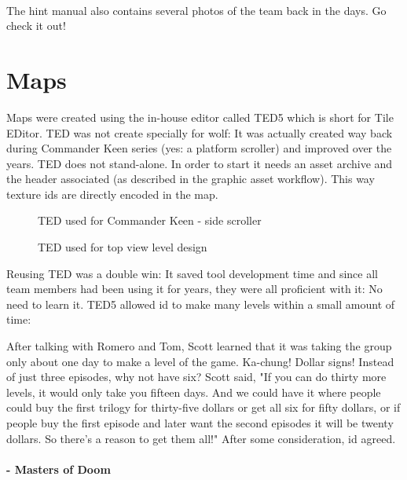 \documentclass[book.tex]{subfiles}
\begin{document}
       \begin{minipage}{.48\textwidth}
  \end{minipage}
      \begin{minipage}{.48\textwidth}
  \end{minipage}\\

\par 
The hint manual also contains several photos of the team back in the days. Go check it out!













\section{Maps}
Maps were created using the in-house editor called TED5 which is short for Tile EDitor. TED was not create specially for wolf: It was actually created way back during Commander Keen series (yes: a platform scroller) and improved over the years. TED does not stand-alone. In order to start it needs an asset archive and the header associated (as described in the graphic asset workflow). This way texture ids are directly encoded in the map.\\

 \begin{figure}[H]
\centering
 \caption{TED used for Commander Keen - side scroller} 
 \end{figure}


\begin{figure}[H]
\centering
 \caption{TED used for top view level design} 
 \end{figure}

Reusing TED was a double win: It saved tool development time and since all team members had been using it for years, they were all proficient with it: No need to learn it. TED5 allowed id to make many levels within a small amount of time:\\
\par

 \begin{fancyquotes}
After talking with Romero and Tom, Scott learned that it was taking the group only about one day to make a level of the game. Ka-chung! Dollar signs! Instead of just three episodes, why not have six? Scott said, "If you can do thirty more levels, it would only take you fifteen days. And we could have it where people could buy the first trilogy for thirty-five dollars or get all six for fifty dollars, or if people buy the first episode and later want the second episodes it will be twenty dollars. So there’s a reason to get them all!" After some consideration, id agreed.\\
\\
 \textbf{- Masters of Doom}
 \end{fancyquotes}\\
\end{document}
